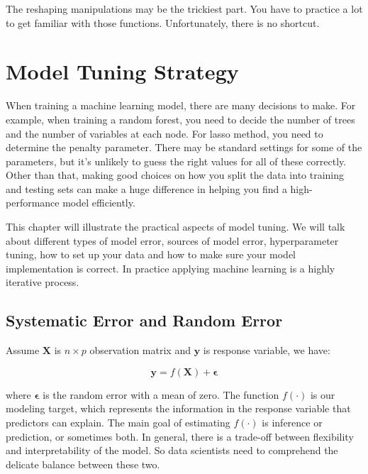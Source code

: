 \documentclass[12pt,]{krantz}
\theoremstyle{definition}
\theoremstyle{definition}
\theoremstyle{definition}
\theoremstyle{remark}
\begin{document}
The reshaping manipulations may be the trickiest part. You have to
practice a lot to get familiar with those functions. Unfortunately,
there is no shortcut.

\chapter{Model Tuning Strategy}\label{model-tuning-strategy}

When training a machine learning model, there are many decisions to
make. For example, when training a random forest, you need to decide the
number of trees and the number of variables at each node. For lasso
method, you need to determine the penalty parameter. There may be
standard settings for some of the parameters, but it's unlikely to guess
the right values for all of these correctly. Other than that, making
good choices on how you split the data into training and testing sets
can make a huge difference in helping you find a high-performance model
efficiently.

This chapter will illustrate the practical aspects of model tuning. We
will talk about different types of model error, sources of model error,
hyperparameter tuning, how to set up your data and how to make sure your
model implementation is correct. In practice applying machine learning
is a highly iterative process.

\section{Systematic Error and Random
Error}\label{systematic-error-and-random-error}

Assume \(\mathbf{X}\) is \(n \times p\) observation matrix and
\(\mathbf{y}\) is response variable, we have:

\[\mathbf{y}=f(\mathbf{X})+\mathbf{\epsilon}\]

where \(\mathbf{\epsilon}\) is the random error with a mean of zero. The
function \(f(\cdot)\) is our modeling target, which represents the
information in the response variable that predictors can explain. The
main goal of estimating \(f(\cdot)\) is inference or prediction, or
sometimes both. In general, there is a trade-off between flexibility and
interpretability of the model. So data scientists need to comprehend the
delicate balance between these two.
\end{document}
